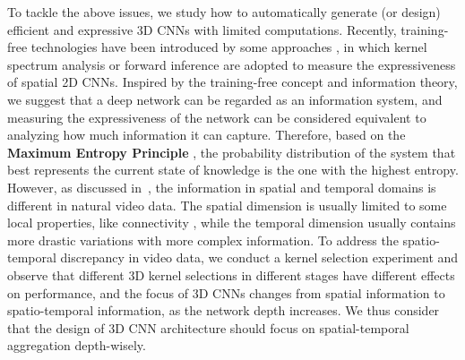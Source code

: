 \documentclass{article} \usepackage{iclr2023_conference,times}
\begin{document}
To tackle the above issues, we study how to automatically generate (or design) efficient and expressive 3D CNNs with limited computations.
Recently, training-free technologies have been introduced by some approaches \citep{ntk,lin2021zen,sun2022mae}, in which kernel spectrum analysis or forward inference are adopted to measure the expressiveness of spatial 2D CNNs. 
Inspired by the training-free concept and information theory, we suggest that a deep network can be regarded as an information system, and measuring the expressiveness of the network can be considered equivalent to analyzing how much information it can capture.
Therefore, based on the \textbf{Maximum Entropy Principle} \citep{jaynes1957information}, the probability distribution of the system that best represents the current state of knowledge is the one with the highest entropy.
However, as discussed in~\citep{xie2018s3d}, the information in spatial and temporal domains is different in natural video data.
The spatial dimension is usually limited to some local properties, like connectivity \citep{claramunt2012towards}, while the temporal dimension usually contains more drastic variations with more complex information.
To address the spatio-temporal discrepancy in video data, we conduct a kernel selection experiment and observe that different 3D kernel selections in different stages have different effects on performance, and the focus of 3D CNNs changes from spatial information to spatio-temporal information, as the network depth increases.
We thus consider that the design of 3D CNN architecture should focus on spatial-temporal aggregation depth-wisely.
\end{document}
